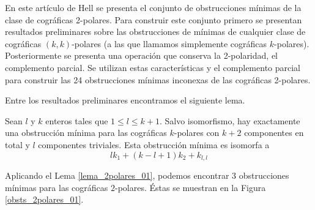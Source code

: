En este artículo de Hell \cite{Hell03} se presenta el conjunto de obstrucciones mínimas de la clase de cográficas 2-polares. Para construir este conjunto primero se presentan resultados preliminares sobre las obstrucciones de mínimas de cualquier clase de cográficas $(k,k)$-polares (a las que llamamos simplemente cográficas $k$-polares). Posteriormente se presenta una operación que conserva la 2-polaridad, el complemento parcial. Se utilizan estas características y el complemento parcial para construir las 24 obstrucciones mínimas inconexas de las cográficas 2-polares.

Entre los resultados preliminares encontramos el siguiente lema.

\begin{lemma}
\label{lema_2polares_01}
Sean $l$ y $k$ enteros tales que $1 \leq l \leq k+1$. Salvo isomorfismo, hay exactamente una obstrucción mínima para las cográficas $k$-polares con $k+2$ componentes en total y $l$ componentes triviales. Esta obstrucción mínima es isomorfa a
$$lk_1+(k-l+1)k_2+k_{l,l}$$
\end{lemma}

Aplicando el Lema \ref{lema_2polares_01}, podemos encontrar 3 obstrucciones mínimas para las cográficas $2$-polares. Éstas se muestran en la Figura \ref{obsts_2polares_01}.

